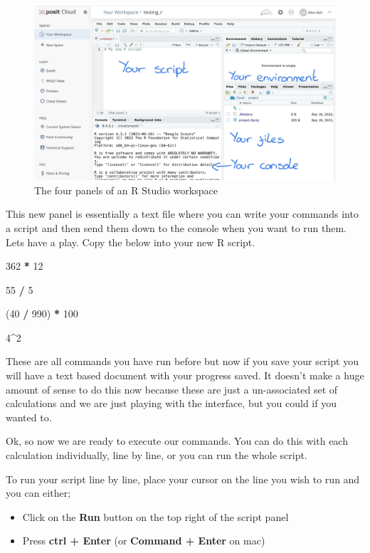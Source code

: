 \documentclass[
]{book}
\newenvironment{Shaded}{\begin{snugshade}}{\end{snugshade}}
\newcommand{\DecValTok}[1]{\textcolor[rgb]{0.00,0.00,0.81}{#1}}
\newcommand{\NormalTok}[1]{#1}
\newcommand{\SpecialCharTok}[1]{\textcolor[rgb]{0.81,0.36,0.00}{\textbf{#1}}}
\providecommand{\tightlist}{%
  \setlength{\itemsep}{0pt}\setlength{\parskip}{0pt}}
\begin{document}
\begin{figure}
\includegraphics[width=0.9\linewidth]{figures/posit7} \caption{The four panels of an R Studio workspace}\label{fig:unnamed-chunk-12}
\end{figure}

This new panel is essentially a text file where you can write your commands into a script and then send them down to the console when you want to run them. Lets have a play. Copy the below into your new R script.

\begin{Shaded}
\begin{Highlighting}[]
\DecValTok{362} \SpecialCharTok{*} \DecValTok{12}

\DecValTok{55} \SpecialCharTok{/} \DecValTok{5}

\NormalTok{(}\DecValTok{40} \SpecialCharTok{/} \DecValTok{990}\NormalTok{) }\SpecialCharTok{*} \DecValTok{100}

\DecValTok{4}\SpecialCharTok{\^{}}\DecValTok{2}
\end{Highlighting}
\end{Shaded}

These are all commands you have run before but now if you save your script you will have a text based document with your progress saved. It doesn't make a huge amount of sense to do this now because these are just a un-associated set of calculations and we are just playing with the interface, but you could if you wanted to.

Ok, so now we are ready to execute our commands. You can do this with each calculation individually, line by line, or you can run the whole script.

To run your script line by line, place your cursor on the line you wish to run and you can either;

\begin{itemize}
\tightlist
\item
  Click on the \textbf{Run} button on the top right of the script panel
\item
  Press \textbf{ctrl + Enter} (or \textbf{Command + Enter} on mac)
\end{itemize}
\end{document}
